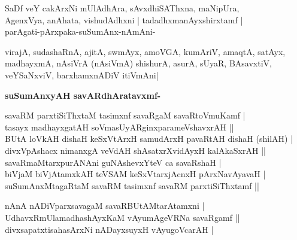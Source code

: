 \begin{artha}
SaDf veY cakArxNi mUlAdhAra, sAvxdhiSAThxna, maNipUra,\\
AgenxVya, anAhata, vishudAdhxni | tadadhxmanAyxshirxtamf |\\\label{154}\label{155}
parAgati-pArxpaka-suSumAnx-nAmAni-
\end{artha}

\begin{artha}
virajA, sudashaRnA, ajitA, swmAyx, amoVGA, kumAriV, amaqtA, satAyx, madhayxmA, nAsiVrA (nAsiVmA) shishurA, asurA, sUyaR, BAsavxtiV, veYSaNxviV, barxhamxnADiV itiVmAni|
\end{artha}

\newpage

{\bigskip
\noindent
{\large\bf suSumAnxyAH savARdhAratavxmf-}}
\medskip

\begin{shloka}
savaRM parxtiSiThxtaM tasimxnf savaRgaM savaRtoVmuKamf |\\
tasayx madhayxgatAH soVmasUyARginxparameVshavxrAH ||\\
BUtA loVkAH dishaH keSxVtArxH samudArxH pavaRtAH dishaH (shilAH) |\\
divxVpAshacx nimanxgA veVdAH shAsatxrXvidAyxH kalAkaSxrAH ||\\
savaRmaMtarxpurANAni guNAshevxYteV ca savaRshaH |\\
biVjaM biVjAtamxkAH teVSAM keSxVtarxjAcnxH pArxNavAyavaH |\\
suSumAnxMtagaRtaM savaRM tasimxnf savaRM parxtiSiThxtamf ||
\end{shloka}


\begin{shloka}
nAnA nADiVparxsavagaM savaRBUtAMtarAtamxni |\\\label{155}
UdhavxRmUlamadhashAyxKaM vAyumAgeVRNa savaRgamf ||\\
divxsapatxtisahasArxNi nADayxsuyxH vAyugoVcarAH |\label{155}
\end{shloka}

